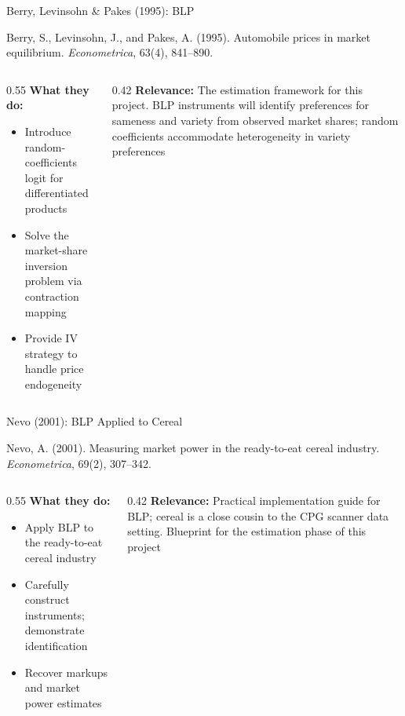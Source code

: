 \documentclass[aspectratio=169,professionalfonts]{beamer}
\newcommand{\hl}[1]{\textbf{\textcolor{UGARed}{#1}}}
\begin{document}
\begin{frame}{Berry, Levinsohn \& Pakes (1995): BLP}
  \begin{tcolorbox}[colback=red!5!white, colframe=UGARed, title=\textbf{Citation}]
    Berry, S., Levinsohn, J., and Pakes, A. (1995). Automobile prices in market
    equilibrium. \textit{Econometrica}, 63(4), 841--890.
  \end{tcolorbox}
  \vspace{6pt}
  \begin{columns}[T]
    \begin{column}{0.55\textwidth}
      \hl{What they do:}
      \begin{itemize}
        \item Introduce random-coefficients logit for differentiated products
        \item Solve the market-share inversion problem via contraction mapping
        \item Provide IV strategy to handle price endogeneity
      \end{itemize}
    \end{column}
    \begin{column}{0.42\textwidth}
      \hl{Relevance:} The estimation framework for this project. BLP instruments will
      identify preferences for sameness and variety from observed market shares; random coefficients
      accommodate heterogeneity in variety preferences
    \end{column}
  \end{columns}
\end{frame}

\begin{frame}{Nevo (2001): BLP Applied to Cereal}
  \begin{tcolorbox}[colback=red!5!white, colframe=UGARed, title=\textbf{Citation}]
    Nevo, A. (2001). Measuring market power in the ready-to-eat cereal industry.
    \textit{Econometrica}, 69(2), 307--342.
  \end{tcolorbox}
  \vspace{6pt}
  \begin{columns}[T]
    \begin{column}{0.55\textwidth}
      \hl{What they do:}
      \begin{itemize}
        \item Apply BLP to the ready-to-eat cereal industry
        \item Carefully construct instruments; demonstrate identification
        \item Recover markups and market power estimates
      \end{itemize}
    \end{column}
    \begin{column}{0.42\textwidth}
      \hl{Relevance:} Practical implementation guide for BLP; cereal is a close cousin
      to the CPG scanner data setting. Blueprint for the estimation phase of this project
    \end{column}
  \end{columns}
\end{frame}
\end{document}
